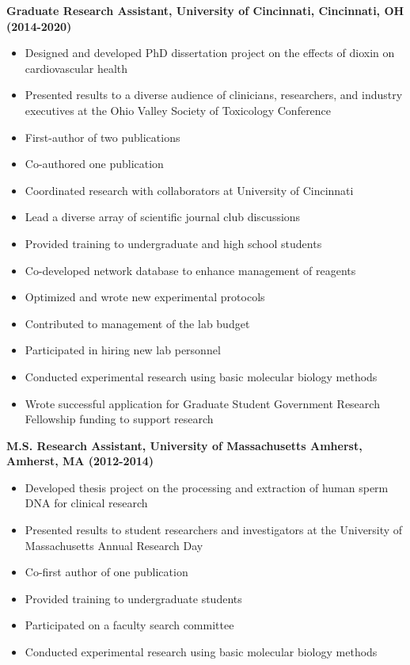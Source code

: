 \documentclass[10pt,a4paper,]{article}
\providecommand{\tightlist}{%
  \setlength{\itemsep}{0pt}\setlength{\parskip}{0pt}}
\begin{document}
\textbf{Graduate Research Assistant, University of Cincinnati,
Cincinnati, OH (2014-2020)}

\begin{itemize}
\tightlist
\item
  Designed and developed PhD dissertation project on the effects of
  dioxin on cardiovascular health
\item
  Presented results to a diverse audience of clinicians, researchers,
  and industry executives at the Ohio Valley Society of Toxicology
  Conference
\item
  First-author of two publications
\item
  Co-authored one publication
\item
  Coordinated research with collaborators at University of Cincinnati
\item
  Lead a diverse array of scientific journal club discussions
\item
  Provided training to undergraduate and high school students
\item
  Co-developed network database to enhance management of reagents
\item
  Optimized and wrote new experimental protocols
\item
  Contributed to management of the lab budget
\item
  Participated in hiring new lab personnel
\item
  Conducted experimental research using basic molecular biology
  methods\\
\item
  Wrote successful application for Graduate Student Government Research
  Fellowship funding to support research
\end{itemize}

\textbf{M.S. Research Assistant, University of Massachusetts Amherst,
Amherst, MA (2012-2014)}

\begin{itemize}
\tightlist
\item
  Developed thesis project on the processing and extraction of human
  sperm DNA for clinical research
\item
  Presented results to student researchers and investigators at the
  University of Massachusetts Annual Research Day
\item
  Co-first author of one publication
\item
  Provided training to undergraduate students
\item
  Participated on a faculty search committee
\item
  Conducted experimental research using basic molecular biology methods
\end{itemize}
\end{document}
